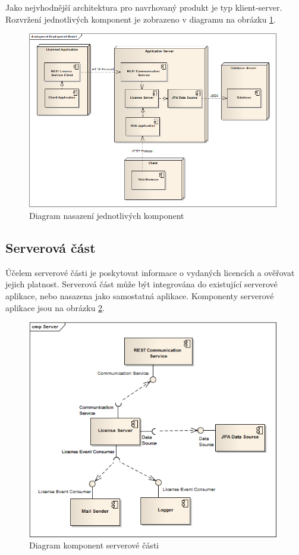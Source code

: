 Jako nejvhodnější architektura pro navrhovaný produkt je typ klient-server.
Rozvržení jednotlivých komponent je zobrazeno v diagramu na obrázku
\ref{fig:deployment}.

\begin{figure}[tbh]
\begin{center}
\includegraphics[width=11cm]{figures/deployment.png}
\caption{Diagram nasazení jednotlivých komponent}
\label{fig:deployment} 
\end{center}
\end{figure}

\subsection{Serverová část}

Účelem serverové části je poskytovat informace o vydaných licencích a ověřovat
jejich platnost. Serverová část může být integrována do existující serverové
aplikace, nebo nasazena jako samostatná aplikace. Komponenty serverové aplikace
jsou na obrázku \ref{fig:components-server}.


\begin{figure}[tbh]
\begin{center}
\includegraphics[width=11cm]{figures/components-server.png}
\caption{Diagram komponent serverové části}
\label{fig:components-server} 
\end{center}
\end{figure}

